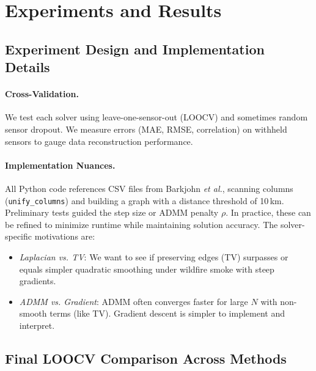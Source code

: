 \documentclass[12pt]{article}                                %
\begin{document}
\section{Experiments and Results}
\label{sec:experiments}  %

\subsection{Experiment Design and Implementation Details}   %
\paragraph{Cross-Validation.} We test each solver using leave-one-sensor-out (LOOCV) and 
sometimes random sensor dropout. We measure errors (MAE, RMSE, correlation) on withheld 
sensors to gauge data reconstruction performance.

\paragraph{Implementation Nuances.}  
All Python code references CSV files from Barkjohn \emph{et al.}, scanning columns 
(\texttt{unify\_columns}) and building a graph with a distance threshold of 10\,km. 
Preliminary tests guided the step size or ADMM penalty $\rho$. In practice, these can be 
refined to minimize runtime while maintaining solution accuracy. The solver-specific 
motivations are:
\begin{itemize}
    \item \textit{Laplacian vs. TV}: We want to see if preserving edges (TV) surpasses or 
    equals simpler quadratic smoothing under wildfire smoke with steep gradients.
    \item \textit{ADMM vs. Gradient}: ADMM often converges faster for large $N$ with 
    non-smooth terms (like TV). Gradient descent is simpler to implement and interpret.
\end{itemize}

\subsection{Final LOOCV Comparison Across Methods}    %
\label{sec:finalLOOCV}
\end{document}
